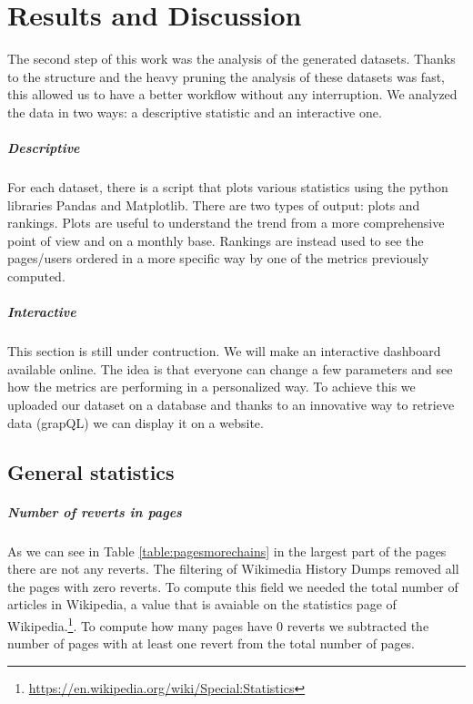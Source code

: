 \chapter{Results and Discussion}

The second step of this work was the analysis of the generated datasets. Thanks to the structure
and the heavy pruning the analysis of these datasets was fast, this allowed us to have a better workflow
without any interruption. We analyzed the data in two ways: a descriptive statistic and an interactive
one.
\paragraph*{Descriptive}
For each dataset, there is a script that plots various statistics using the python libraries
Pandas and Matplotlib. There are two types of output: plots and rankings. 
Plots are useful to understand the trend from a more comprehensive point of view and on a monthly base.  
Rankings are instead used to see the pages/users ordered in a more specific way by one of the
metrics previously computed. 
\paragraph*{Interactive}
This section is still under contruction. We will make an interactive dashboard available online. The idea is
that everyone can change a few parameters and see how the metrics are performing in a personalized
way. To achieve this we uploaded our dataset on a database and thanks to an innovative way to retrieve
data (grapQL) we can display it on a website. 


\section{General statistics}
\paragraph*{Number of reverts in pages}
As we can see in Table \ref{table:pagesmorechains} in the largest part of the pages there are not any reverts. The filtering of Wikimedia
History Dumps removed all the pages with zero reverts. To compute this field we needed the total
number of articles in Wikipedia, a value that is avaiable on the statistics page of
Wikipedia.\footnote{\url{https://en.wikipedia.org/wiki/Special:Statistics}}. To compute how many
pages have 0 reverts we subtracted the number of pages with at least one revert from the total number
of pages.

